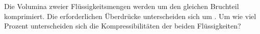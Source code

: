 Die Volumina zweier Flüssigkeitsmengen werden um den gleichen Bruchteil komprimiert. Die erforderlichen Überdrücke unterscheiden sich um \dprO. Um wie viel Prozent unterscheiden sich die Kompressibilitäten der beiden Flüssigkeiten?
